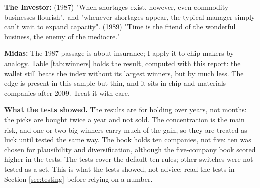 \documentclass[11pt,a4paper]{article}
\begin{document}
\textbf{The Investor:} (1987) "When shortages exist, however, even commodity businesses flourish", and "whenever shortages appear, the typical manager simply can't wait to expand capacity". (1989) "Time is the friend of the wonderful business, the enemy of the mediocre."

\textbf{Midas:} The 1987 passage is about insurance; I apply it to chip makers by analogy. Table \ref{tab:winners} holds the result, computed with this report: the wallet still beats the index without its largest winners, but by much less. The edge is present in this sample but thin, and it sits in chip and materials companies after 2009. Treat it with care.

\textbf{What the tests showed.} The results are for holding over years, not months: the picks are bought twice a year and not sold. The concentration is the main risk, and one or two big winners carry much of the gain, so they are treated as luck until tested the same way. The book holds ten companies, not five: ten was chosen for plausibility and diversification, although the five-company book scored higher in the tests. The tests cover the default ten rules; other switches were not tested as a set. This is what the tests showed, not advice; read the tests in Section \ref{sec:testing} before relying on a number.
\end{document}
